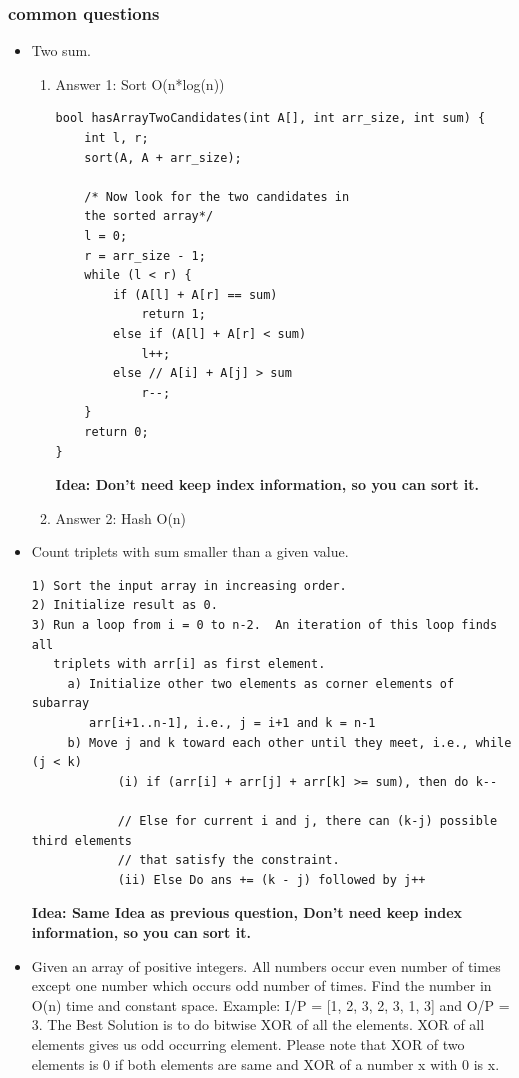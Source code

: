 \documentclass[a4paper,11pt,twoside]{book}
\begin{document}
\subsubsection{common questions}
\begin{itemize}
	\item Two sum. 
\begin{enumerate}
\item Answer 1: Sort O(n*log(n))
\begin{lstlisting}[tabsize=3]
bool hasArrayTwoCandidates(int A[], int arr_size, int sum) { 
	int l, r; 
	sort(A, A + arr_size); 
	
	/* Now look for the two candidates in  
	the sorted array*/
	l = 0; 
	r = arr_size - 1; 
	while (l < r) { 
		if (A[l] + A[r] == sum) 
			return 1; 
		else if (A[l] + A[r] < sum) 
			l++; 
		else // A[i] + A[j] > sum 
			r--; 
	} 
	return 0; 
} 
\end{lstlisting}
\textbf{Idea: Don't need keep index information, so you can sort it. }

\item Answer 2: Hash O(n)
\end{enumerate}

\item Count triplets with sum smaller than a given value. 
\begin{lstlisting}[breaklines]
1) Sort the input array in increasing order. 
2) Initialize result as 0.
3) Run a loop from i = 0 to n-2.  An iteration of this loop finds all
   triplets with arr[i] as first element.
     a) Initialize other two elements as corner elements of subarray 
        arr[i+1..n-1], i.e., j = i+1 and k = n-1
     b) Move j and k toward each other until they meet, i.e., while (j < k)
            (i) if (arr[i] + arr[j] + arr[k] >= sum), then do k-- 

            // Else for current i and j, there can (k-j) possible third elements 
            // that satisfy the constraint.
            (ii) Else Do ans += (k - j) followed by j++ 
\end{lstlisting}
\textbf{Idea: Same Idea as previous question, Don't need keep index information, so you can sort it. }


	\item Given an array of positive integers. All numbers occur even number of times except one number which occurs odd number of times. Find the number in O(n) time and constant space.
Example: I/P = [1, 2, 3, 2, 3, 1, 3] and O/P = 3. The Best Solution is to do bitwise XOR of all the elements. XOR of all elements gives us odd occurring element. Please note that XOR of two elements is 0 if both elements are same and XOR of a number x with 0 is x.


\end{itemize}
\end{document}
